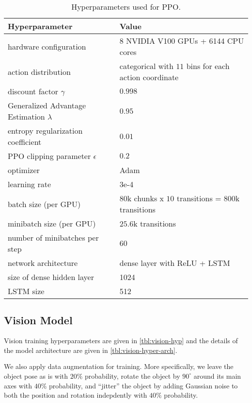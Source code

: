 \begin{table}[h!]
    \footnotesize
    \centering
    \caption{Hyperparameters used for PPO.}
    \renewcommand{\arraystretch}{1.3}
    \begin{tabular}{@{}ll@{}}
        \toprule
        \textbf{Hyperparameter} & \textbf{Value} \\ \midrule
        hardware configuration & 8 NVIDIA V100 GPUs + 6144 CPU cores \\ 
        action distribution & categorical with $11$ bins for each action coordinate \\
        discount factor $\gamma$ & $0.998$ \\
        Generalized Advantage Estimation $\lambda$ & $0.95$ \\
        entropy regularization coefficient & $0.01$ \\
        PPO clipping parameter $\epsilon$ & $0.2$ \\
        optimizer & Adam~\citep{adam} \\
        learning rate & 3e-4 \\
        batch size (per GPU) & $80$k chunks x $10$ transitions = $800$k transitions \\
        minibatch size (per GPU) & $25.6$k transitions \\
        number of minibatches per step & $60$ \\
        network architecture & dense layer with ReLU + LSTM \\
        size of dense hidden layer & 1024 \\
        LSTM size & 512 \\
    \bottomrule\end{tabular}
    \label{tbl:ppo}
\end{table}

\FloatBarrier




\subsection{Vision Model}\label{app:vision-hyper}\label{app:vision_training}
Vision training hyperparameters are given in \autoref{tbl:vision-hyp} and the details of the model architecture are given in \autoref{tbl:vision-hyper-arch}.

We also apply data augmentation for training. More specifically, we leave the object pose as is with $20\%$ probability, rotate the object by $90^{\circ}$ around its main axes with $40\%$ probability, and ``jitter'' the object by adding Gaussian noise to both the position and rotation indepdently with $40\%$ probability.



